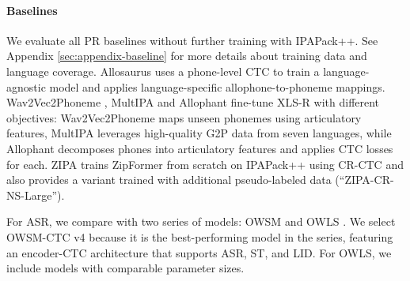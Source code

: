 \paragraph{Baselines}
We evaluate all PR baselines without further training with IPAPack++. See Appendix \autoref{sec:appendix-baseline} for more details about training data and language coverage.
Allosaurus \cite{li2020universal,li2021hierarchical} uses a phone-level CTC to train a language-agnostic model and applies language-specific allophone-to-phoneme mappings. 
Wav2Vec2Phoneme \citep{xu22b_interspeech}, MultIPA \cite{taguchi23_interspeech} and Allophant \cite{glocker23_interspeech} fine-tune XLS-R \citep{babu22_interspeech} with different objectives: Wav2Vec2Phoneme maps unseen phonemes using articulatory features, MultIPA leverages high-quality G2P data from seven languages, while Allophant decomposes phones into articulatory features and applies CTC losses for each. 
ZIPA \cite{zhu-etal-2025-zipa} trains ZipFormer \citep{yao2023zipformer} from scratch on IPAPack++ using CR-CTC and also provides a variant trained with additional pseudo-labeled data (``ZIPA-CR-NS-Large'').

For ASR, we compare \POWSM with two series of models: OWSM \cite{peng25c_interspeech} and OWLS \cite{chen2025owls}. We select OWSM-CTC v4 because it is the best-performing model in the series, featuring an encoder-CTC architecture that supports ASR, ST, and LID. For OWLS, we include models with comparable parameter sizes. 

